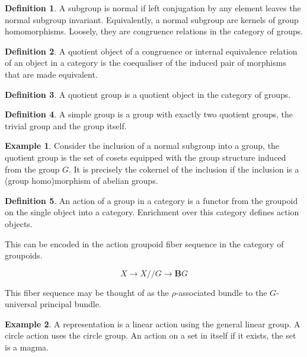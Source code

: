\documentclass[10pt]{article}
\theoremstyle{plain}%
\theoremstyle{definition}
\newtheorem{definition}{Definition}[section]
\newtheorem{example}{Example}[section]
\theoremstyle{remark}
\begin{document}
\begin{definition}
	A subgroup is normal if left conjugation by any element leaves the normal subgroup invariant. Equivalently, a normal subgroup are kernels of group homomorphisms. Loosely, they are congruence relations in the category of groups.
\end{definition}

\begin{definition}
	A quotient object of a congruence or internal equivalence relation of an object in a category is the coequaliser of the induced pair of morphisms that are made equivalent.
\end{definition}

\begin{definition}
	A quotient group is a quotient object in the category of groups.
\end{definition}

\begin{definition}
	A simple group is a group with exactly two quotient groups, the trivial group and the group itself.
\end{definition}

\begin{example}
	Consider the inclusion of a normal subgroup into a group, the quotient group is the set of cosets equipped with the group structure induced from the group $G$. It is precisely the cokernel of the inclusion if the inclusion is a (group homo)morphism of abelian groups.
\end{example}

\begin{definition}
	An action of a group in a category is a functor from the groupoid on the single object into a category.
	Enrichment over this category defines action objects.

	This can be encoded in the action groupoid fiber sequence in the category of groupoids.

	\begin{equation}
		X \rightarrow X // G \rightarrow \mathbf{B}G
	\end{equation}

	This fiber sequence may be thought of as the $\rho$-associated bundle to the $G$-universal principal bundle.
\end{definition}

\begin{example}
	A representation is a linear action using the general linear group. A circle action uses the circle group. An action on a set in itself if it exists, the set is a magma.
\end{example}
\end{document}
